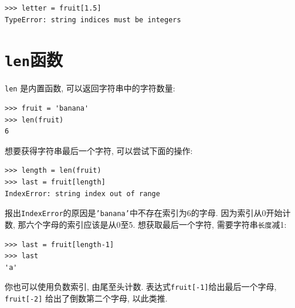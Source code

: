 \documentclass[10pt]{book}
\begin{document}
\begin{verbatim}
>>> letter = fruit[1.5]
TypeError: string indices must be integers
\end{verbatim}
%

\section{{\tt len}函数}

{\tt len} 是内置函数, 可以返回字符串中的字符数量:

\begin{verbatim}
>>> fruit = 'banana'
>>> len(fruit)
6
\end{verbatim}
%
想要获得字符串最后一个字符, 可以尝试下面的操作:

\begin{verbatim}
>>> length = len(fruit)
>>> last = fruit[length]
IndexError: string index out of range
\end{verbatim}
%
报出{\tt IndexError}的原因是{\tt 'banana'}中不存在索引为6的字母. 
因为索引从0开始计数, 那六个字母的索引应该是从0至5.
想获取最后一个字符, 需要字符串{\tt 长度}减1:

\begin{verbatim}
>>> last = fruit[length-1]
>>> last
'a'
\end{verbatim}
%
你也可以使用负数索引, 由尾至头计数. 
表达式{\tt fruit[-1]}给出最后一个字母, 
{\tt fruit[-2]} 给出了倒数第二个字母, 以此类推. 

\end{document}
